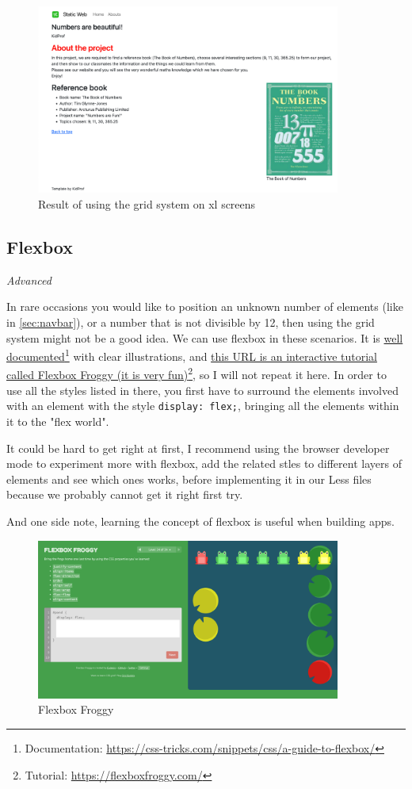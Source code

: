 \begin{figure}[H]
\centering
\includegraphics[width=10cm]{images/chn6-grid-xl.png}
\caption{Result of using the grid system on xl screens}
\end{figure}

\subsection{Flexbox}
\label{sec:flexbox}

\textit{Advanced}
\vspace{6mm}

In rare occasions you would like to position an unknown number of elements (like in \cref{sec:navbar}), or a number that is not divisible by 12, then using the grid system might not be a good idea. We can use flexbox in these scenarios. It is \href{https://css-tricks.com/snippets/css/a-guide-to-flexbox/}{well documented}\footnote{Documentation: \url{https://css-tricks.com/snippets/css/a-guide-to-flexbox/}} with clear illustrations, and \href{https://flexboxfroggy.com/}{this URL is an interactive tutorial called Flexbox Froggy (it is very fun)}\footnote{Tutorial: \url{https://flexboxfroggy.com/}}, so I will not repeat it here. In order to use all the styles listed in there, you first have to surround the elements involved with an element with the style \texttt{display: flex;}, bringing all the elements within it to the "flex world".

It could be hard to get right at first, I recommend using the browser developer mode to experiment more with flexbox, add the related stles to different layers of elements and see which ones works, before implementing it in our Less files because we probably cannot get it right first try.

And one side note, learning the concept of flexbox is useful when building apps.

\begin{figure}[h]
\centering
\includegraphics[width=10cm]{images/chn6-flexboxfroggy.png}
\caption{Flexbox Froggy}
\end{figure}

